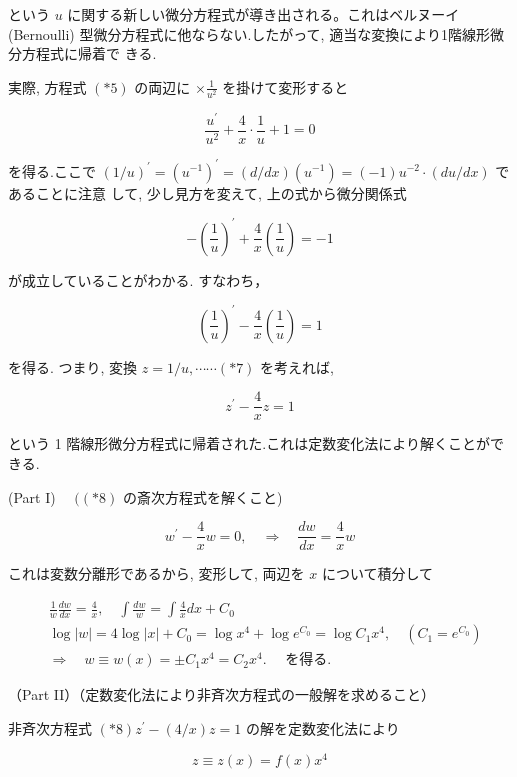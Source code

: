\documentclass[10pt]{article}
\begin{document}
という $u$ に関する新しい微分方程式が導き出される。これはベルヌーイ (Bernoulli) 型微分方程式に他ならない.したがって, 適当な変換により1階線形微分方程式に帰着で きる.

実際, 方程式 $(* 5)$ の両辺に $\times \frac{1}{u^{2}}$ を掛けて変形すると

$$
\frac{u^{\prime}}{u^{2}}+\frac{4}{x} \cdot \frac{1}{u}+1=0
$$

を得る.ここで $(1 / u)^{\prime}=\left(u^{-1}\right)^{\prime}=(d / d x)\left(u^{-1}\right)=(-1) u^{-2} \cdot(d u / d x)$ であることに注意 して, 少し見方を変えて, 上の式から微分関係式

$$
-\left(\frac{1}{u}\right)^{\prime}+\frac{4}{x}\left(\frac{1}{u}\right)=-1
$$

が成立していることがわかる. すなわち，


\begin{equation*}
\left(\frac{1}{u}\right)^{\prime}-\frac{4}{x}\left(\frac{1}{u}\right)=1 \tag{*6}
\end{equation*}


を得る. つまり, 変換 $z=1 / u, \cdots \cdots(* 7)$ を考えれば,


\begin{equation*}
z^{\prime}-\frac{4}{x} z=1 \tag{*8}
\end{equation*}


という 1 階線形微分方程式に帰着された.これは定数変化法により解くことができる.

(Part I) $\quad((* 8)$ の斎次方程式を解くこと)

$$
w^{\prime}-\frac{4}{x} w=0, \quad \Longrightarrow \quad \frac{d w}{d x}=\frac{4}{x} w
$$

これは変数分離形であるから, 変形して, 両辺を $x$ について積分して

$$
\begin{aligned}
& \frac{1}{w} \frac{d w}{d x}=\frac{4}{x}, \quad \int \frac{d w}{w}=\int \frac{4}{x} d x+C_{0} \\
& \log |w|=4 \log |x|+C_{0}=\log x^{4}+\log e^{C_{0}}=\log C_{1} x^{4}, \quad\left(C_{1}=e^{C_{0}}\right) \\
& \Longrightarrow \quad w \equiv w(x)= \pm C_{1} x^{4}=C_{2} x^{4} . \quad \text { を得る. }
\end{aligned}
$$

（Part II）（定数変化法により非斉次方程式の一般解を求めること）

非斉次方程式 $(* 8) z^{\prime}-(4 / x) z=1$ の解を定数変化法により


\begin{equation*}
z \equiv z(x)=f(x) x^{4} \tag{*9}
\end{equation*}
\end{document}
